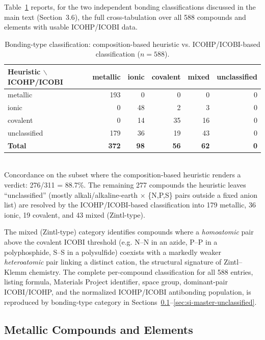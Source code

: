 \documentclass[11pt]{article}
\begin{document}
Table~\ref{tab:si-bondtype-full} reports, for the two independent bonding
classifications discussed in the main text (Section~3.6), the full
cross-tabulation over all 588 compounds and elements with usable
ICOHP/ICOBI data.

\begin{table}[htbp]
\centering
\caption{Bonding-type classification: composition-based heuristic vs.
ICOHP/ICOBI-based classification ($n=588$).}
\label{tab:si-bondtype-full}
\begin{tabular}{@{}lrrrrr@{}}
\toprule
Heuristic $\backslash$ ICOHP/ICOBI & metallic & ionic & covalent & mixed & unclassified \\
\midrule
metallic     & 193 & 0  & 0  & 0  & 0 \\
ionic        & 0   & 48 & 2  & 3  & 0 \\
covalent     & 0   & 14 & 35 & 16 & 0 \\
unclassified & 179 & 36 & 19 & 43 & 0 \\
\midrule
\textbf{Total} & \textbf{372} & \textbf{98} & \textbf{56} & \textbf{62} & \textbf{0} \\
\bottomrule
\end{tabular}
\vspace{0.15cm}
\\{\footnotesize Concordance on the subset where the composition-based
heuristic renders a verdict: 276/311 = 88.7\%. The remaining 277 compounds
the heuristic leaves ``unclassified'' (mostly alkali/alkaline-earth $\times$
\{N,P,S\} pairs outside a fixed anion list) are resolved by the
ICOHP/ICOBI-based classification into 179 metallic, 36 ionic, 19 covalent,
and 43 mixed (Zintl-type).}
\end{table}

The mixed (Zintl-type) category identifies compounds where a
\emph{homoatomic} pair above the covalent ICOBI threshold (e.g. N--N in an
azide, P--P in a polyphosphide, S--S in a polysulfide) coexists with a
markedly weaker \emph{heteroatomic} pair linking a distinct cation, the
structural signature of Zintl--Klemm chemistry. The complete per-compound
classification for all 588 entries, listing formula, Materials Project
identifier, space group, dominant-pair ICOBI/ICOHP, and the normalized
ICOHP/ICOBI antibonding population, is reproduced by bonding-type category
in Sections~\ref{sec:si-master-metallic}--\ref{sec:si-master-unclassified}.

\subsection{Metallic Compounds and Elements}
\label{sec:si-master-metallic}
{\footnotesize

}
\end{document}
